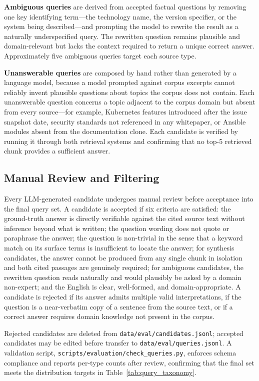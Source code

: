 \textbf{Ambiguous queries} are derived from accepted factual questions by removing one key identifying term---the technology name, the version specifier, or the system being described---and prompting the model to rewrite the result as a naturally underspecified query. The rewritten question remains plausible and domain-relevant but lacks the context required to return a unique correct answer. Approximately five ambiguous queries target each source type.

\textbf{Unanswerable queries} are composed by hand rather than generated by a language model, because a model prompted against corpus excerpts cannot reliably invent plausible questions about topics the corpus does not contain. Each unanswerable question concerns a topic adjacent to the corpus domain but absent from every source---for example, Kubernetes features introduced after the issue snapshot date, security standards not referenced in any whitepaper, or Ansible modules absent from the documentation clone. Each candidate is verified by running it through both retrieval systems and confirming that no top-5 retrieved chunk provides a sufficient answer.

\subsection{Manual Review and Filtering}

Every LLM-generated candidate undergoes manual review before acceptance into the final query set. A candidate is accepted if six criteria are satisfied: the ground-truth answer is directly verifiable against the cited source text without inference beyond what is written; the question wording does not quote or paraphrase the answer; the question is non-trivial in the sense that a keyword match on its surface terms is insufficient to locate the answer; for synthesis candidates, the answer cannot be produced from any single chunk in isolation and both cited passages are genuinely required; for ambiguous candidates, the rewritten question reads naturally and would plausibly be asked by a domain non-expert; and the English is clear, well-formed, and domain-appropriate. A candidate is rejected if its answer admits multiple valid interpretations, if the question is a near-verbatim copy of a sentence from the source text, or if a correct answer requires domain knowledge not present in the corpus.

Rejected candidates are deleted from \texttt{data/eval/candidates.jsonl}; accepted candidates may be edited before transfer to \texttt{data/eval/queries.jsonl}. A validation script, \texttt{scripts/evaluation/check\_queries.py}, enforces schema compliance and reports per-type counts after review, confirming that the final set meets the distribution targets in Table~\ref{tab:query_taxonomy}.

